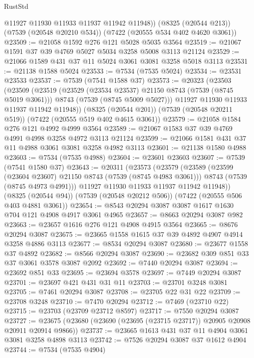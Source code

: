 \begin{lexlean}{RustStd}
\begin{coremodule}
        @11927
        @11930
        @11933
        @11937
        @11942
        @11948))
    (@8325 (@20544 @213))
    (@7539 (@20548 @20210 @534))
    (@7422 (@20555 @534 @402 @4620 @3061))
@23509 := @21058 @1592 @276 @121 @5028 @5035 @3564
@23519 := @21067 @1591 @37 @39 @4769 @5027 @5034 @3258 @5008 @3113 @21124
@23529 := @21066 @1589 @431 @37 @11 @5024 @3061 @3081 @3258 @5018 @3113
@23531 := @21138 @1588 @5024
@23533 := @7534 (@7535 @5024)
@23534 := @23531 @23533
@23537 := @7539 (@7541 @1588 @37)
@23573 := @20323
    (@23503
      (@23509
        (@23519
          (@23529 (@23534 @23537) @21150 @8743 (@7539 (@8745 @5019 @3061)))
          @8743
          (@7539 (@8745 @5009 @5027)))
        @11927
        @11930
        @11933
        @11937
        @11942
        @11948))
    (@8325 (@20544 @201))
    (@7539 (@20548 @20211 @519))
    (@7422 (@20555 @519 @402 @4615 @3061))
@23579 := @21058 @1584 @276 @121 @4992 @4999 @3564
@23589 := @21067 @1583 @37 @39 @4769 @4991 @4998 @3258 @4972 @3113 @21124
@23599 := @21066 @1581 @431 @37 @11 @4988 @3061 @3081 @3258 @4982 @3113
@23601 := @21138 @1580 @4988
@23603 := @7534 (@7535 @4988)
@23604 := @23601 @23603
@23607 := @7539 (@7541 @1580 @37)
@23643 := @20311
    (@23573
      (@23579
        (@23589
          (@23599 (@23604 @23607) @21150 @8743 (@7539 (@8745 @4983 @3061)))
          @8743
          (@7539 (@8745 @4973 @4991)))
        @11927
        @11930
        @11933
        @11937
        @11942
        @11948))
    (@8325 (@20544 @94))
    (@7539 (@20548 @20212 @506))
    (@7422 (@20555 @506 @403 @4881 @3061))
@23654 := @8543 @20294 @3087 @3087 @1617 @1630 @704 @121 @4908 @4917 @3061 @4965
@23657 := @8663 @20294 @3087 @982
@23663 := @23657 @1616 @276 @121 @4908 @4915 @3564
@23665 := @8676 @20294 @3087
@23675 := @23665 @1558 @1615 @37 @39 @4892 @4907 @4914 @3258 @4886 @3113
@23677 := @8534 @20294 @3087
@23680 := @23677 @1558 @37 @4892
@23682 := @8566 @20294 @3087
@23690 := @23682 @309 @851 @33 @37 @3061 @3578 @3087 @2092
@23692 := @7440 @20294 @3087
@23694 := @23692 @851 @33
@23695 := @23694 @3578
@23697 := @7449 @20294 @3087
@23701 := @23697 @421 @431 @31 @11
@23703 := @23701 @3248 @3081
@23705 := @7461 @20294 @3087
@23708 := @23705 @22 @31 @22
@23709 := @23708 @3248
@23710 := @7470 @20294
@23712 := @7469 (@23710 @22)
@23715 := @23703 (@23709 @23712 @8597)
@23717 := @7550 @20294 @3087
@23727 := @23675 (@23680 (@23690 (@23695 (@23715 @23717)) @20905 @20908 @20911 @20914 @9866))
@23737 := @23665 @1613 @431 @37 @11 @4904 @3061 @3081 @3258 @4898 @3113
@23742 := @7526 @20294 @3087 @37 @1612 @4904
@23744 := @7534 (@7535 @4904)

\end{coremodule}
\end{lexlean}
